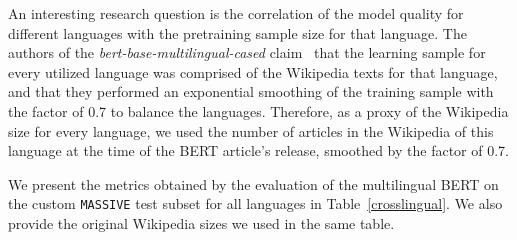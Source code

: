 An interesting research question is the correlation of the model quality for different languages with the pretraining sample size for that language. The authors of the \textit{bert-base-multilingual-cased} claim~\cite{multilingual_bert} that the learning sample for every utilized language was comprised of the Wikipedia texts for that language, and that they performed an exponential smoothing of the training sample with the factor of 0.7 to balance the languages. Therefore, as a proxy of the Wikipedia size for every language, we used the number of articles in the Wikipedia of this language at the time of the BERT article's release, smoothed by the factor of 0.7. 

We present the metrics obtained by the evaluation of the multilingual BERT on the custom \texttt{MASSIVE} test subset for all languages in Table~\ref{crosslingual}. We also provide the original Wikipedia sizes we used in the same table.


